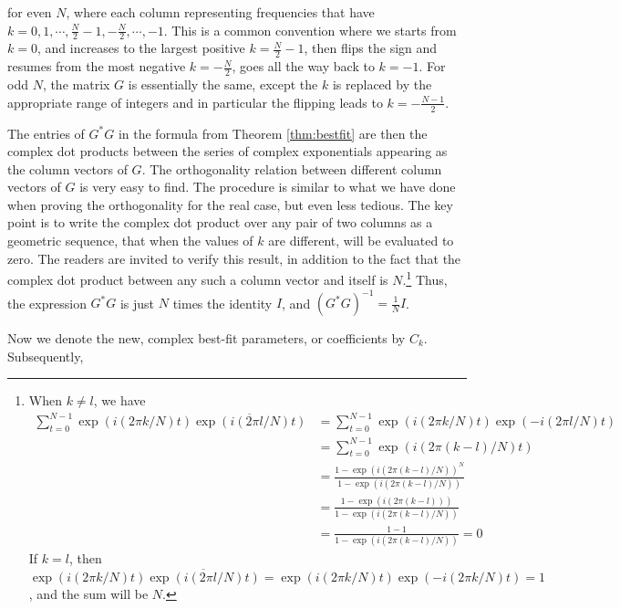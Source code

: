 for even $N$, where each column representing frequencies that have $k = 0, 1, \cdots, \frac{N}{2}-1, -\frac{N}{2}, \cdots, -1$. This is a common convention where we starts from $k = 0$, and increases to the largest positive $k = \frac{N}{2}-1$, then flips the sign and resumes from the most negative $k = -\frac{N}{2}$, goes all the way back to $k = -1$. For odd $N$, the matrix $G$ is essentially the same, except the $k$ is replaced by the appropriate range of integers and in particular the flipping leads to $k = -\frac{N-1}{2}$. \par
The entries of $G^*G$ in the formula from Theorem \ref{thm:bestfit} are then the complex dot products between the series of complex exponentials appearing as the column vectors of $G$. The orthogonality relation between different column vectors of $G$ is very easy to find. The procedure is similar to what we have done when proving the orthogonality for the real case, but even less tedious. The key point is to write the complex dot product over any pair of two columns as a geometric sequence, that when the values of $k$ are different, will be evaluated to zero. The readers are invited to verify this result, in addition to the fact that the complex dot product between any such a column vector and itself is $N$.\footnote{When $k \neq l$, we have \begin{align*}
\sum_{t=0}^{N-1} \exp(i (2\pi k/N) t)\overline{\exp(i (2\pi l/N) t)} &= \sum_{t=0}^{N-1} \exp(i (2\pi k/N) t)\exp(-i (2\pi l/N) t) \\
&= \sum_{t=0}^{N-1} \exp(i (2\pi (k-l)/N) t) \\
&= \frac{1-\exp(i (2\pi (k-l)/N))^N}{1-\exp(i (2\pi (k-l)/N))} \\
&= \frac{1-\exp(i (2\pi (k-l)))}{1-\exp(i (2\pi (k-l)/N))} \\
&= \frac{1-1}{1-\exp(i (2\pi (k-l)/N))} = 0
\end{align*} If $k = l$, then $\exp(i (2\pi k/N) t)\overline{\exp(i (2\pi l/N) t)} =  \exp(i (2\pi k/N) t)\exp(-i (2\pi k/N) t) = 1$, and the sum will be $N$.} Thus, the expression $G^*G$ is just $N$ times the identity $I$, and $(G^*G)^{-1} = \frac{1}{N} I$. \par
Now we denote the new, complex best-fit parameters, or coefficients by $C_k$. Subsequently,
